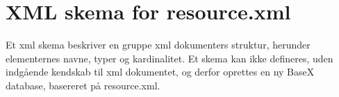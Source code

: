 \chapter{XML skema for resource.xml}
\label{sec:XML skema}

Et xml skema beskriver en gruppe xml dokumenters struktur, herunder elementernes navne, typer og kardinalitet. Et skema kan ikke defineres, uden indgående kendskab til xml dokumentet, og derfor oprettes en ny BaseX database, basereret på resource.xml.
